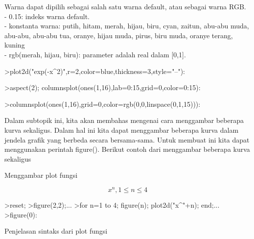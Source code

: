 \documentclass[a4paper,10pt]{article}
\begin{document}
\begin{eulernotebook}
\begin{eulercomment}
\begin{eulercomment}
\begin{eulerttcomment}
\end{eulerttcomment}
\begin{eulercomment}
Warna dapat dipilih sebagai salah satu warna default, atau sebagai
warna RGB.\\
- 0.15: indeks warna default.\\
- konstanta warna: putih, hitam, merah, hijau, biru, cyan, zaitun,
abu-abu muda, abu-abu, abu-abu tua, oranye, hijau muda, pirus, biru
muda, oranye terang, kuning\\
- rgb(merah, hijau, biru): parameter adalah real dalam [0,1].
\end{eulercomment}
\begin{eulerprompt}
>plot2d("exp(-x^2)",r=2,color=blue,thickness=3,style="--"):
\end{eulerprompt}
\begin{eulerprompt}
>aspect(2); columnsplot(ones(1,16),lab=0:15,grid=0,color=0:15):
\end{eulerprompt}
\begin{eulerprompt}
>columnsplot(ones(1,16),grid=0,color=rgb(0,0,linspace(0,1,15))):
\end{eulerprompt}
\begin{eulercomment}
Dalam subtopik ini, kita akan membahas mengenai cara menggambar
beberapa kurva sekaligus. Dalam hal ini kita dapat menggambar beberapa
kurva dalam jendela grafik yang berbeda secara bersama-sama. Untuk
membuat ini kita dapat menggunakan perintah figure(). Berikut contoh
dari menggambar beberapa kurva sekaligus

Menggambar plot fungsi\\
\end{eulercomment}
\begin{eulerformula}
\[
x^n, 1 \leq n \leq 4
\]
\end{eulerformula}
\begin{eulerprompt}
>reset;
>figure(2,2);...
>for n=1 to 4; figure(n); plot2d("x^"+n); end;...
>figure(0):
\end{eulerprompt}
\begin{eulercomment}
Penjelasan sintaks dari plot fungsi


\end{eulercomment}
\end{eulercomment}
\end{eulercomment}
\end{eulernotebook}
\end{document}
